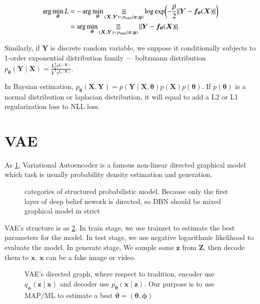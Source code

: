 \documentclass{article}
\begin{document}
\begin{align}
  \label{eq:mse}
  \arg\min_{\bm{\theta}}L
  & = -\arg\min_{\bm{\theta}}
  \mathop{\mathbb{E}}_{(\bm{X}, \bm{Y}) \sim p_\mathrm{train}(\bm{x}, \bm{y})}
  \log\exp(-\frac{\beta}{2} \norm{\bm{Y} - \bm{f}_{\bm{\theta}}(\bm{X})})\\
  & = \arg\min_{\bm{\theta}}
  \mathop{\mathbb{E}}_{(\bm{X}, \bm{Y}) \sim p_\mathrm{train}(\bm{x}, \bm{y})}
  \norm{\bm{Y} - \bm{f}_{\bm{\theta}}(\bm{X})}
\end{align}

Similarly, if $\bm{Y}$ is discrete random variable, we suppose it conditionally
subjects to 1-order exponential distribution family --- boltzmann distribution
$p_{\bm{\theta}}(\bm{Y}\mid\bm{X}) =
\frac{\bm{1}_{Y}^\mathsf{T}\mathrm{e}^{\bm{f}_\theta(\bm{X})}}
{\bm{1}^\mathsf{T}\mathrm{e}^{\bm{f}_\theta(\bm{X})}}$.

In Baysian estimation, $p_{\bm{\theta}}(\bm{X}, \bm{Y}) =
p(\bm{Y}\mid\bm{X}, \bm{\theta})p(\bm{X})p(\bm{\theta})$. If $p(\bm{\theta})$ is a
normal distribution or laplacian distribution, it will equal to add a
L2 or L1 regularization loss to NLL loss.

\section{VAE}

As \cref{fig:category}, Variational Autoencoder is a famous non-linear
directed graphical model which task is usually probability density estimation
and generation.

\begin{figure}[htpb]
  \centering
  
  \caption{categories of structured probabilistic model. Because only the first layer of deep belief nework is directed, so DBN should be mixed graphical model in strict}%
  \label{fig:category}
\end{figure}

VAE's structure is as \cref{fig:vae}. In train stage, we use trainset to
estimate the best parameters for the model. In test stage, we use negative
logarithmic likelihood to evaluate the model. In generate stage, We sample some
$\bm{z}$ from $\bm{Z}$, then decode them to $\bm{x}$. $\bm{x}$ can be a fake
image or video.

\begin{figure}[htpb]
  \centering
  
  \caption{VAE's directed graph, where respect to tradition, encoder use
    $q_{\bm{\phi}}(\bm{z}\mid\bm{x})$ and decoder use
  $p_{\bm{\theta}}(\bm{x}\mid\bm{z})$. Our purpose is to use MAP/ML to estimate
  a best $\bm{\vartheta} = (\bm{\theta}, \bm{\phi})$}%
  \label{fig:vae}
\end{figure}
\end{document}
